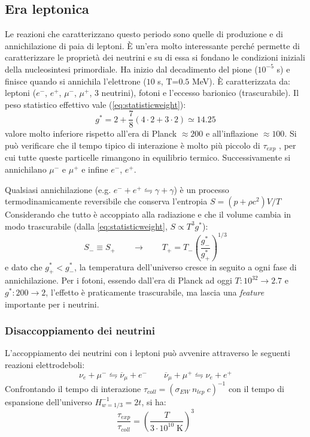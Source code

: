 \subsection{Era leptonica}
Le reazioni che caratterizzano questo periodo sono quelle di produzione e di annichilazione di paia di leptoni. È un'era molto interessante perché permette di caratterizzare le proprietà dei neutrini e su di essa si fondano le condizioni iniziali della nucleosintesi primordiale. Ha inizio dal decadimento del pione ($10^{-5}$ s) e finisce quando si annichila l'elettrone ($10$ s, T=$0.5$ MeV). È caratterizzata da: leptoni ($e^-$, $e^+$, $\mu^-$, $\mu^+$, 3 neutrini), fotoni e l'eccesso barionico (trascurabile). Il peso statistico effettivo vale (\ref{eq:statisticweight}):
$$
g^* = 2 + \frac{7}{8}(4\cdot 2 + 3 \cdot 2) \simeq 14.25
$$
valore molto inferiore rispetto all'era di Planck $\approx 200$ e all'inflazione $\approx 100$. Si può verificare che il tempo tipico di interazione è molto più piccolo di $\tau_{exp}$ , per cui tutte queste particelle rimangono in equilibrio termico. Successivamente si annichilano $\mu^-$ e $\mu^+$ e infine $e^-$, $e^+$.

Qualsiasi annichilazione (e.g. $e^- + e^+ \leftrightharpoons \gamma + \gamma$) è un processo termodinamicamente reversibile che conserva l'entropia $S=(p+\rho c^2)V/T$ Considerando che tutto è accoppiato alla radiazione e che il volume cambia in modo trascurabile (dalla \ref{eq:statisticweight}, $S\propto T^3g^*$):
\begin{equation}
    S_{-} \equiv S_{+} \qquad \rightarrow \qquad T_+ = T_- \left(\frac{g^*_-}{g^*_+}\right)^{1/3} 
\end{equation} 
e dato che $g^*_+ < g^*_-$, la temperatura dell'universo cresce in seguito a ogni fase di annichilazione. Per i fotoni, essendo dall'era di Planck ad oggi $T: 10^{32}\rightarrow 2.7$ e $g^*: 200\rightarrow 2$, l'effetto è praticamente trascurabile, ma lascia una \textit{feature} importante per i neutrini.

\subsubsection{Disaccoppiamento dei neutrini}

L'accoppiamento dei neutrini con i leptoni può avvenire attraverso le seguenti reazioni elettrodeboli:
$$
\nu_e + \mu^- \leftrightharpoons {\overbar{\nu}_\mu} + e^- \qquad {\overbar{\nu}_\mu} + \mu^+ \leftrightharpoons \nu_e + e^+ 
$$
Confrontando il tempo di interazione $\tau_{coll}=(\sigma_{EW}~n_{lep}~c)^{-1}$ con il tempo di espansione dell'universo $H^{-1}_{w=1/3} = 2t$, si ha: 
\begin{equation}
    \frac{\tau_{exp}}{\tau_{coll}}= \left (\frac{T}{3\cdot 10^{10}\;\mathrm{K}}\right)^3
\end{equation}

